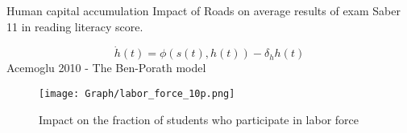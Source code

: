 \documentclass[9pt]{beamer}
\begin{document}
\begin{frame}{Human capital accumulation}
\small Impact of Roads on average results of exam Saber 11 in reading literacy score.  \hyperlink{A 3.5}{}   
\hyperlink{A 3.6}{}

\begin{equation}
    \dot{h}(t) = \phi(s(t),h(t)) - \delta_{h}h(t) 
\end{equation}
 Acemoglu 2010 \cite{acemoglu}- The Ben-Porath model

\begin{center} 
     \begin{figure}[H]
         \centering
         \texttt{[image: Graph/labor\_force\_10p.png]}
         \caption{Impact on the fraction of students who participate in labor force }
         \label{fig:labor_force_10p}
     \end{figure}
\end{center}  
\end{frame}


\end{document}
